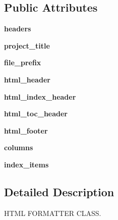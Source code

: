 \subsection*{Public Attributes}
\begin{DoxyCompactItemize}
\item 
\mbox{\label{classtohtml_1_1_html_formatter_a4d46721d3370aa612977b691cddacd65}} 
{\bfseries headers}
\item 
\mbox{\label{classtohtml_1_1_html_formatter_a82fc97650919d8b41b9b5a1ea28ca213}} 
{\bfseries project\+\_\+title}
\item 
\mbox{\label{classtohtml_1_1_html_formatter_a4b97e7c421f8c2b9d7ab54b83b83ed84}} 
{\bfseries file\+\_\+prefix}
\item 
\mbox{\label{classtohtml_1_1_html_formatter_a80f222e1509c01e2ba7c9c23d6b78a5c}} 
{\bfseries html\+\_\+header}
\item 
\mbox{\label{classtohtml_1_1_html_formatter_a1d73f98eb628c3b73fdbb09be7eaa43f}} 
{\bfseries html\+\_\+index\+\_\+header}
\item 
\mbox{\label{classtohtml_1_1_html_formatter_a7c70103415276425ba26fc03ce867fd5}} 
{\bfseries html\+\_\+toc\+\_\+header}
\item 
\mbox{\label{classtohtml_1_1_html_formatter_ac82a5868a196d53c2b34b391de6d366b}} 
{\bfseries html\+\_\+footer}
\item 
\mbox{\label{classtohtml_1_1_html_formatter_aeab78a72bc3d583efe9d648494d7a97d}} 
{\bfseries columns}
\item 
\mbox{\label{classtohtml_1_1_html_formatter_af88ba178900fa5fc99d8b6628d9976c7}} 
{\bfseries index\+\_\+items}
\end{DoxyCompactItemize}


\subsection{Detailed Description}
H\+T\+ML F\+O\+R\+M\+A\+T\+T\+ER C\+L\+A\+SS. 

